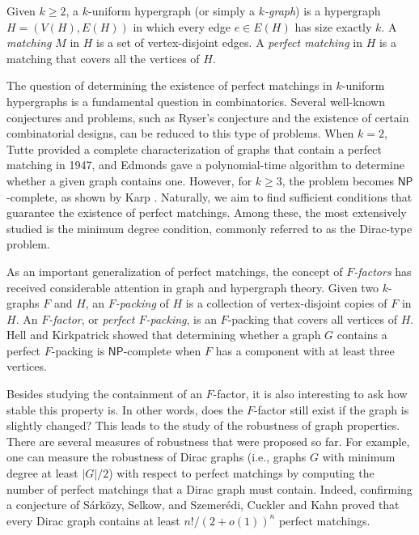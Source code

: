 \documentclass[11pt, letterpaper]{amsart}
\theoremstyle{plain}
\numberwithin{equation}{section}
\theoremstyle{definition}
\newcommand\card[1]{\left| #1 \right|}
\begin{document}
    Given $k\ge 2$, a $k$-uniform hypergraph (or simply a \emph{$k$-graph}) is a hypergraph $H = (V(H), E(H))$ in which every edge $e \in E(H)$ has size exactly $k$.
    A \emph{matching} $M$ in $H$ is a set of vertex-disjoint edges. 
    A \emph{perfect matching} in $H$ is a matching that covers all the vertices of $H$.
    
    The question of determining the existence of perfect matchings in $k$-uniform hypergraphs is a fundamental question in combinatorics. 
    Several well-known conjectures and problems, such as Ryser's conjecture and the existence of certain combinatorial designs, can be reduced to this type of problems. 
    When $k=2$, Tutte \cite{tutte1947factorization} provided a complete characterization of graphs that contain a perfect matching in 1947, and Edmonds \cite{edmonds1965paths} gave a polynomial-time algorithm to determine whether a given graph contains one. 
    However, for $k \ge 3$, the problem becomes \(\mathsf{NP}\)-complete, as shown by Karp \cite{karp2009reducibility}. 
    Naturally, we aim to find sufficient conditions that guarantee the existence of perfect matchings. 
    Among these, the most extensively studied is the minimum degree condition, commonly referred to as the Dirac-type problem.

    As an important generalization of perfect matchings, the concept of \emph{$F$-factors} has received considerable attention in graph and hypergraph theory. 
    Given two $k$-graphs $F$ and $H$, an \emph{$F$-packing} of $H$ is a collection of vertex-disjoint copies of $F$ in $H$. 
    An \emph{$F$-factor}, or \emph{perfect \(F\)-packing}, is an $F$-packing that covers all vertices of $H$.
    Hell and Kirkpatrick \cite{kirkpatrick1983complexity} showed that determining whether a graph $G$ contains a perfect $F$-packing is \(\mathsf{NP}\)-complete when $F$ has a component with at least three vertices.


    Besides studying the containment of an \(F\)-factor, it is also interesting to ask how stable this property is. 
    In other words, does the \(F\)-factor still exist if the graph is slightly changed? 
    This leads to the study of the robustness of graph properties. 
    There are several measures of robustness that were proposed so far.
    For example, one can measure the robustness of Dirac graphs (i.e., graphs \(G\) with minimum degree at least \(\card{G}/2\)) with respect to perfect matchings by computing the number of perfect matchings that a Dirac graph must contain. 
    Indeed, confirming a conjecture of S\'{a}rk\"{o}zy,  Selkow, and Szemer\'{e}di\cite{sarkozy2003number}, Cuckler and Kahn \cite{cuckler2009hamiltonian} proved that every Dirac graph contains at least \(n!/{(2+o(1))}^n\) perfect matchings.
    
\end{document}
